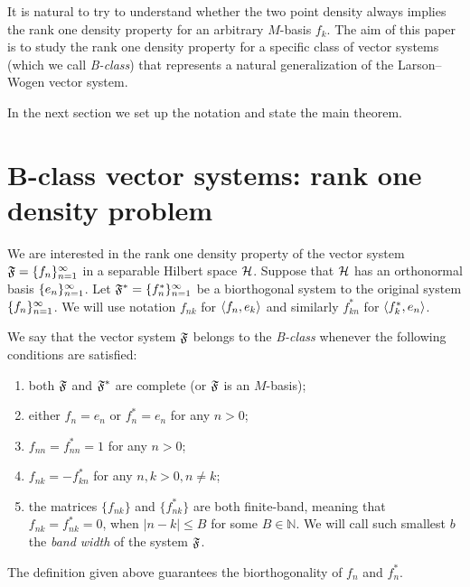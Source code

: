 \documentclass[12pt,oneside,a4paper]{amsart}
\begin{document}
  It is natural to try to understand whether the two point density always implies the rank one density property for an arbitrary $M$-basis $f_k$.
  The aim of this paper is to study the rank one density property for a specific class of vector systems (which we call \emph{B-class})
    that represents a natural generalization of the Larson--Wogen vector system.

  In the next section we set up the notation and state the main theorem.

\bigskip
\section{B-class vector systems: rank one density problem}
    \label{fsys2graphs}
    We are interested in the rank one density property of the vector system $\fsys = \seq{f}$
      in a separable Hilbert space $\cal{H}$.
    Suppose that $\cal{H}$ has an orthonormal basis $\seq{e}$.
    Let $\fstarsys = \{f_n^{*}\}_{n=1}^\infty$ be a biorthogonal system to the original system $\seq{f}$.
    We will use notation $f_{nk}$ for $\inner{f_n}{e_k}$ and similarly $f^*_{kn}$ for $\inner{f^*_k}{e_n}$.
    \begin{definition}
      We say that the vector system $\fsys$ belongs to the \emph{B-class} whenever the following conditions are satisfied:
      \begin{enumerate}[label=\textbf{C\arabic*}]
        \item \label{c1} both $\fsys$ and $\fstarsys$ are complete (or $\fsys$ is an $M$-basis);
        \item \label{c2} either $f_n = e_n$ or $f^*_n = e_n$ for any $n > 0$;
        \item \label{c3} $f_{nn} = f^*_{nn} = 1$ for any $n > 0$;
        \item \label{c4} $f_{nk} = -f^*_{kn}$ for any $n, k > 0, n \neq k$;
        \item \label{c5} the matrices $\{f_{nk}\}$ and $\{f^*_{nk}\}$ are both finite-band,
            meaning that $f_{nk} = f^*_{nk} = 0$, when $\lvert n - k \rvert \leq B$ for some $B \in \mathbb{N}$.
          We will call such smallest $b$ the \emph{band width} of the system $\fsys$.
      \end{enumerate}
    \end{definition}
    \begin{prop}
      The definition given above guarantees the biorthogonality of $f_n$ and $f^*_n$.
    \end{prop}
\end{document}
